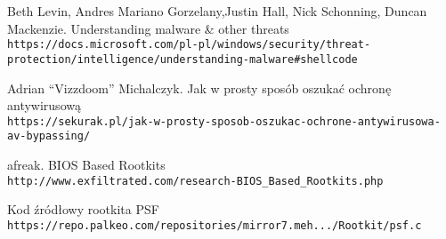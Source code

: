 \begin{thebibliography}{9}
Beth Levin, Andres Mariano Gorzelany,Justin Hall, Nick Schonning, Duncan Mackenzie. Understanding malware \& other threats
\\\texttt{https://docs.microsoft.com/pl-pl/windows/security/threat-protection/intelligence/understanding-malware\#shellcode}


Adrian “Vizzdoom” Michalczyk. Jak w prosty sposób oszukać ochronę antywirusową
\\\texttt{https://sekurak.pl/jak-w-prosty-sposob-oszukac-ochrone-antywirusowa-av-bypassing/}

afreak. BIOS Based Rootkits
\\\texttt{http://www.exfiltrated.com/research-BIOS\_Based\_Rootkits.php}

Kod źródłowy rootkita PSF
\\\texttt{https://repo.palkeo.com/repositories/mirror7.meh.../Rootkit/psf.c}





\end{thebibliography}